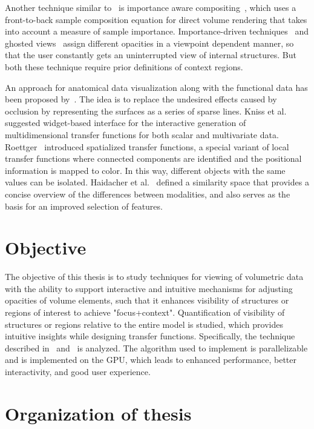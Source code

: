 Another technique similar to~\cite{m} is importance aware compositing~\cite{44}, which uses a front-to-back sample composition equation for direct volume rendering that takes into account a measure of sample importance. Importance-driven techniques~\cite{m} and ghosted views~\cite{h} assign different opacities in a viewpoint dependent manner, so that the user constantly gets an uninterrupted view of internal structures. 
But both these technique require prior definitions of context regions.

An approach for anatomical data visualization along with the functional data has been proposed by~\cite{add1}. The idea is to replace the undesired effects caused by occlusion by representing the surfaces as a series of sparse lines. Kniss et al.~\cite{add2} suggested widget-based interface for the interactive generation of multidimensional transfer functions for both scalar and multivariate data.  
Roettger~\cite{add3} introduced spatialized transfer functions, a special variant of local transfer functions where connected components are identified and the positional information is mapped to color. In this way, different objects with the same values can be isolated. Haidacher et al.~\cite{add4} defined a similarity space that provides a concise overview of the differences between modalities, and also serves as the basis for an improved selection of features.

\section{Objective}

The objective of this thesis is to study techniques for viewing of volumetric data with the ability to support interactive and intuitive mechanisms for adjusting opacities of volume elements, such that it enhances visibility of structures or regions of interest to achieve "focus+context". Quantification of visibility of structures or regions relative to the entire model is studied, which provides intuitive insights while designing transfer functions. Specifically, the technique described in~\cite{vdtf} and~\cite{mm} is analyzed. The algorithm used to implement is parallelizable and is implemented on the GPU, which leads to enhanced performance, better interactivity, and good user experience. 


\section{Organization of thesis}

